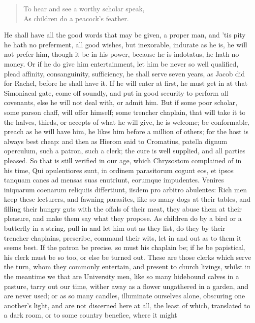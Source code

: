 {\begin{verse}
To hear and see a worthy scholar speak,\\
As children do a peacock's feather.
\end{verse}
%
He shall have all the good words that may be given, a proper man,
and 'tis pity he hath no preferment, all good wishes, but inexorable,
indurate as he is, he will not prefer him, though it be in his power,
because he is indotatus, he hath no money. Or if he do give him
entertainment, let him be never so well qualified, plead affinity,
consanguinity, sufficiency, he shall serve seven years, as Jacob did
for Rachel, before he shall have it. If he will enter at first,
he must get in at that Simoniacal gate, come off soundly, and put in
good security to perform all covenants, else he will not deal with, or
admit him. But if some poor scholar, some parson chaff, will offer
himself; some trencher chaplain, that will take it to the halves,
thirds, or accepts of what he will give, he is welcome; be conformable,
preach as he will have him, he likes him before a million of others;
for the host is always best cheap: and then as Hierom said to
Cromatius, patella dignum operculum, such a patron, such a clerk; the
cure is well supplied, and all parties pleased. So that is still
verified in our age, which Chrysostom complained of in his time,
Qui opulentiores sunt, in ordinem parasitorum cogunt eos, et ipsos
tanquam canes ad mensas suas enutriunt, eorumque impudentes. Venires
iniquarum coenarum reliquiis differtiunt, iisdem pro arbitro abulentes:
Rich men keep these lecturers, and fawning parasites, like so many dogs
at their tables, and filling their hungry guts with the offals of their
meat, they abuse them at their pleasure, and make them say what they
propose. As children do by a bird or a butterfly in a string,
pull in and let him out as they list, do they by their trencher
chaplains, prescribe, command their wits, let in and out as to them it
seems best. If the patron be precise, so must his chaplain be; if he be
papistical, his clerk must be so too, or else be turned out. These are
those clerks which serve the turn, whom they commonly entertain, and
present to church livings, whilst in the meantime we that are
University men, like so many hidebound calves in a pasture, tarry out
our time, wither away as a flower ungathered in a garden, and are never
used; or as so many candles, illuminate ourselves alone, obscuring one
another's light, and are not discerned here at all, the least of which,
translated to a dark room, or to some country benefice, where it might
}
